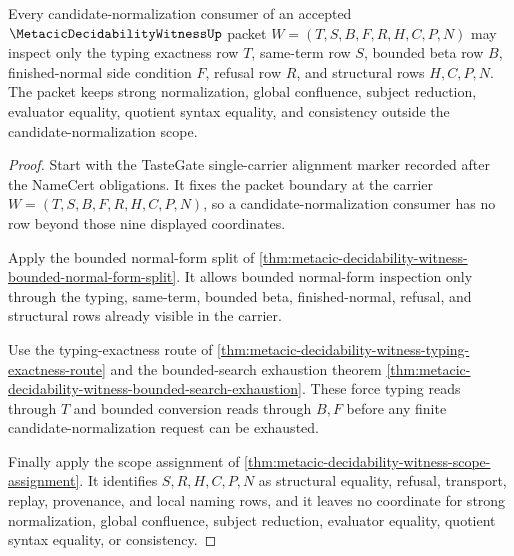 \begin{theorem}
\label{thm:metacic-decidability-witness-candidate-normalization-scope}
Every candidate-normalization consumer of an accepted $\MetacicDecidabilityWitnessUp$ packet $W=(T,S,B,F,R,H,C,P,N)$ may inspect only the typing exactness row $T$, same-term row $S$, bounded beta row $B$, finished-normal side condition $F$, refusal row $R$, and structural rows $H,C,P,N$. The packet keeps strong normalization, global confluence, subject reduction, evaluator equality, quotient syntax equality, and consistency outside the candidate-normalization scope.
\end{theorem}
\begin{proof}
Start with the TasteGate single-carrier alignment marker recorded after the NameCert obligations. It fixes the packet boundary at the carrier $W=(T,S,B,F,R,H,C,P,N)$, so a candidate-normalization consumer has no row beyond those nine displayed coordinates.

Apply the bounded normal-form split of \autoref{thm:metacic-decidability-witness-bounded-normal-form-split}. It allows bounded normal-form inspection only through the typing, same-term, bounded beta, finished-normal, refusal, and structural rows already visible in the carrier.

Use the typing-exactness route of \autoref{thm:metacic-decidability-witness-typing-exactness-route} and the bounded-search exhaustion theorem \autoref{thm:metacic-decidability-witness-bounded-search-exhaustion}. These force typing reads through $T$ and bounded conversion reads through $B,F$ before any finite candidate-normalization request can be exhausted.

Finally apply the scope assignment of \autoref{thm:metacic-decidability-witness-scope-assignment}. It identifies $S,R,H,C,P,N$ as structural equality, refusal, transport, replay, provenance, and local naming rows, and it leaves no coordinate for strong normalization, global confluence, subject reduction, evaluator equality, quotient syntax equality, or consistency.
\end{proof}


